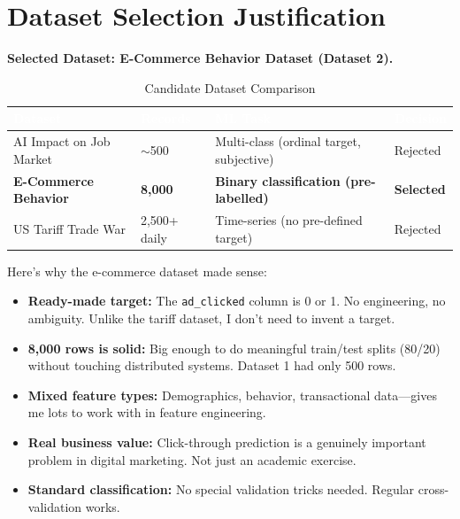 \documentclass[11pt,a4paper]{article}
\begin{document}
\newpage

\section{Dataset Selection Justification}

\textbf{Selected Dataset: E-Commerce Behavior Dataset (Dataset 2).}

\begin{table}[H]
\centering
\caption{Candidate Dataset Comparison}
\small
\begin{tabular}{L{4cm} L{2cm} L{4cm} L{2.5cm}}
\toprule
{}
\textcolor{white}{\textbf{Dataset}} &
\textcolor{white}{\textbf{Records}} &
\textcolor{white}{\textbf{ML Task}} &
\textcolor{white}{\textbf{Decision}} \\
\midrule
AI Impact on Job Market
  & $\sim$500
  & Multi-class (ordinal target, subjective)
  & Rejected \\
\textbf{\color{bcublue}E-Commerce Behavior}
  & \textbf{8,000}
  & \textbf{Binary classification (pre-labelled)}
  & \textbf{\color{bcublue}Selected} \\
US Tariff Trade War
  & 2,500+ daily
  & Time-series (no pre-defined target)
  & Rejected \\
\bottomrule
\end{tabular}
\end{table}

Here's why the e-commerce dataset made sense:

\begin{itemize}[leftmargin=1.5em, itemsep=3pt]
  \item \textbf{Ready-made target:} The \texttt{ad\_clicked} column is 0 or 1. No engineering, no ambiguity. Unlike the tariff dataset, I don't need to invent a target.
  \item \textbf{8,000 rows is solid:} Big enough to do meaningful train/test splits (80/20) without touching distributed systems. Dataset 1 had only 500 rows.
  \item \textbf{Mixed feature types:} Demographics, behavior, transactional data—gives me lots to work with in feature engineering.
  \item \textbf{Real business value:} Click-through prediction is a genuinely important problem in digital marketing. Not just an academic exercise.
  \item \textbf{Standard classification:} No special validation tricks needed. Regular cross-validation works.
\end{itemize}
\end{document}
